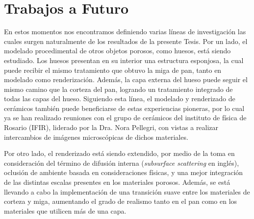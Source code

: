 \section{Trabajos a Futuro}
En estos momentos nos encontramos definiendo varias líneas de investigación las cuales surgen naturalmente de los resultados de la presente Tesis.
Por un lado, el modelado procedimental de otros objetos porosos, como huesos, está siendo estudiado.
Los huesos presentan en su interior una estructura esponjosa, la cual puede recibir el mismo tratamiento que obtuvo la miga de pan, tanto en modelado como renderización.
Además, la capa externa del hueso puede seguir el mismo camino que la corteza del pan, logrando un tratamiento integrado de todas las capas del hueso.
Siguiendo esta línea, el modelado y renderizado de cerámicos también puede beneficiarse de estas experiencias pioneras, por lo cual ya se han realizado reuniones con el grupo de cerámicos del instituto de física de Rosario (IFIR), liderado por la Dra. Nora Pellegri, con vistas a realizar intercambios de imágenes microscópicas de dichos materiales.

Por otro lado, el renderizado está siendo extendido, por medio de la toma en consideración del término de difusión interna ({\em subsurface scattering} en inglés), oclusión de ambiente basada en consideraciones físicas, y una mejor integración de las distintas escalas presentes en los materiales porosos.
Además, se está llevando a cabo la implementación de una transición suave entre los materiales de corteza y miga, aumentando el grado de realismo tanto en el pan como en los materiales que utilicen más de una capa.

